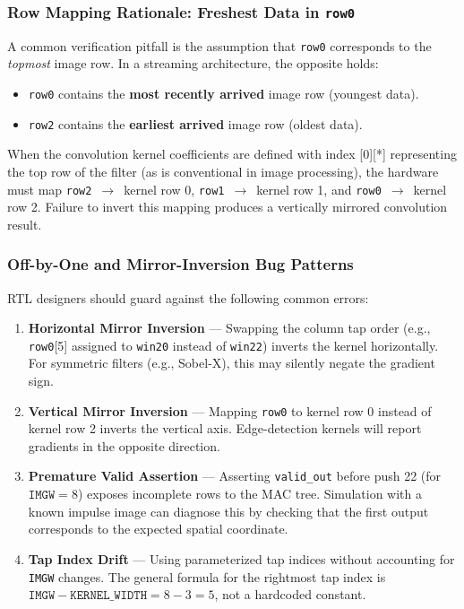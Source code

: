 \documentclass[11pt,a4paper]{report}
\begin{document}
\subsubsection{Row Mapping Rationale: Freshest Data in \texttt{row0}}

A common verification pitfall is the assumption that \texttt{row0} corresponds to the \emph{topmost} image row. In a streaming architecture, the opposite holds:

\begin{itemize}[leftmargin=2em]
    \item \texttt{row0} contains the \textbf{most recently arrived} image row (youngest data).
    \item \texttt{row2} contains the \textbf{earliest arrived} image row (oldest data).
\end{itemize}

When the convolution kernel coefficients are defined with index [0][*] representing the top row of the filter (as is conventional in image processing), the hardware must map \texttt{row2}~$\rightarrow$~kernel row 0, \texttt{row1}~$\rightarrow$~kernel row 1, and \texttt{row0}~$\rightarrow$~kernel row 2. Failure to invert this mapping produces a vertically mirrored convolution result.

\subsubsection{Off-by-One and Mirror-Inversion Bug Patterns}

RTL designers should guard against the following common errors:

\begin{enumerate}[leftmargin=2em]
    \item \textbf{Horizontal Mirror Inversion} --- Swapping the column tap order (e.g., \texttt{row0}[5] assigned to \texttt{win20} instead of \texttt{win22}) inverts the kernel horizontally. For symmetric filters (e.g., Sobel-X), this may silently negate the gradient sign.

    \item \textbf{Vertical Mirror Inversion} --- Mapping \texttt{row0} to kernel row 0 instead of kernel row 2 inverts the vertical axis. Edge-detection kernels will report gradients in the opposite direction.

    \item \textbf{Premature Valid Assertion} --- Asserting \texttt{valid\_out} before push 22 (for $\mathtt{IMGW} = 8$) exposes incomplete rows to the MAC tree. Simulation with a known impulse image can diagnose this by checking that the first output corresponds to the expected spatial coordinate.

    \item \textbf{Tap Index Drift} --- Using parameterized tap indices without accounting for \texttt{IMGW} changes. The general formula for the rightmost tap index is $\mathtt{IMGW} - \mathtt{KERNEL\_WIDTH} = 8 - 3 = 5$, not a hardcoded constant.
\end{enumerate}
\end{document}
